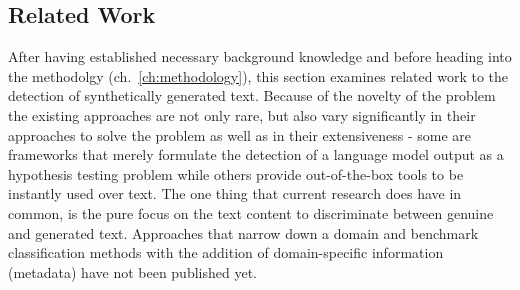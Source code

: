 \subsection{Related Work}
\label{sec:related_work}

After having established necessary background knowledge and before heading into the methodolgy (ch.~\ref{ch:methodology}), this section examines related work to the detection of synthetically generated text. Because of the novelty of the problem the existing approaches are not only rare, but also vary significantly in their approaches to solve the problem as well as in their extensiveness - some are frameworks that merely formulate the detection of a language model output as a hypothesis testing problem while others provide out-of-the-box tools to be instantly used over text. The one thing that current research does have in common, is the pure focus on the text content to discriminate between genuine and generated text. Approaches that narrow down a domain and benchmark classification methods with the addition of domain-specific information (metadata) have not been published yet.






